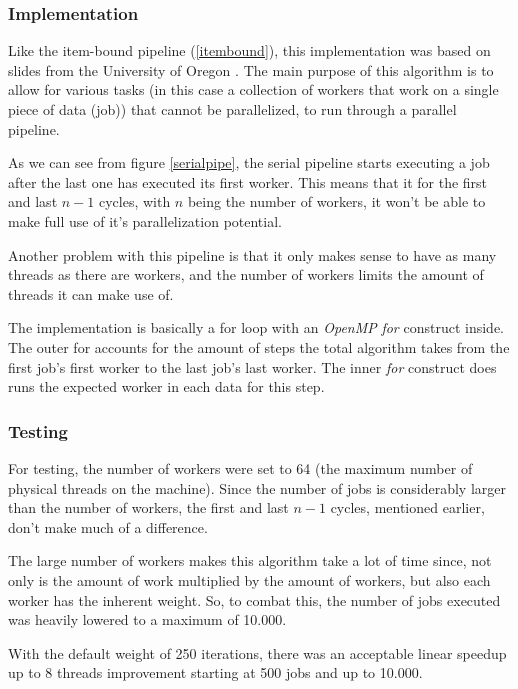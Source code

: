\documentclass[10pt,journal]{IEEEtran}
\begin{document}
\subsubsection{Implementation}

Like the item-bound pipeline (\ref{itembound}), this implementation was based on slides  from the University of Oregon \cite{pipelineoregon}. The main purpose of this algorithm is to allow for various tasks (in this case a collection of workers that work on a single piece of data (job)) that cannot be parallelized, to run through a parallel pipeline. 

As we can see from figure \ref{serialpipe}, the serial pipeline starts executing a job after the last one has executed its first worker. This means that it for the first and last $ n - 1 $ cycles, with $ n $ being the number of workers, it won't be able to make full use of it's parallelization potential. 

Another problem with this pipeline is that it only makes sense to have as many threads as there are workers, and the number of workers limits the amount of threads it can make use of.

The implementation is basically a for loop with an \textit{OpenMP} \textit{for} construct inside. The outer for accounts for the amount of steps the total algorithm takes from the first job's first worker to the last job's last worker. The inner \textit{for} construct does runs the expected worker in each data for this step.

\subsubsection{Testing}

For testing, the number of workers were set to 64 (the maximum number of physical threads on the machine). Since the number of jobs is considerably larger than the number of workers, the first and last $ n - 1 $ cycles, mentioned earlier, don't make much of a difference.

The large number of workers makes this algorithm take a lot of time since, not only is the amount of work multiplied by the amount of workers, but also each worker has the inherent weight. So, to combat this, the number of jobs executed was heavily lowered to a maximum of 10.000.

With the default weight of 250 iterations, there was an acceptable linear speedup up to 8 threads improvement starting at 500 jobs and up to 10.000.
\end{document}
